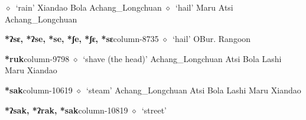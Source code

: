 \hspace{1ex}
         $\diamond$~`rain'
         Xiandao 
\hspace{1ex}
         Bola 
\hspace{1ex}
         Achang\_Longchuan 
\hspace{1ex}
         $\diamond$~`hail'
         Maru 
\hspace{1ex}
         Atsi 
\hspace{1ex}
         Achang\_Longchuan 
  \item {\footnotesize \textbf{*ʔsɛ, *ʔse, *se, *ʃe, *ʃɛ, *sɛ}}{\tiny column-8735}
         $\diamond$~`hail'
         OBur. 
\hspace{1ex}
         Rangoon 
  \item {\footnotesize \textbf{*ruk}}{\tiny column-9798}
         $\diamond$~`shave (the head)'
         Achang\_Longchuan 
\hspace{1ex}
         Atsi 
\hspace{1ex}
         Bola 
\hspace{1ex}
         Lashi 
\hspace{1ex}
         Maru 
\hspace{1ex}
         Xiandao 
  \item {\footnotesize \textbf{*sak}}{\tiny column-10619}
         $\diamond$~`steam'
         Achang\_Longchuan 
\hspace{1ex}
         Atsi 
\hspace{1ex}
         Bola 
\hspace{1ex}
         Lashi 
\hspace{1ex}
         Maru 
\hspace{1ex}
         Xiandao 
  \item {\footnotesize \textbf{*ʔsak, *ʔrak, *sak}}{\tiny column-10819}
         $\diamond$~`street'
